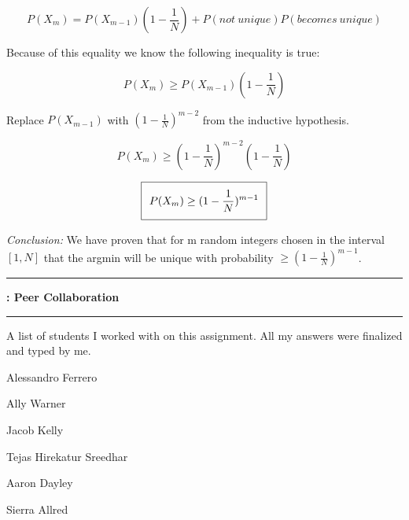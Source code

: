 \documentclass[11pt]{article}
\newcommand\question[2]{\vspace{.25in}\hrule\textbf{#1: #2}\vspace{.5em}\hrule\vspace{.10in}}
\begin{document}
$$P(X_{m}) = P(X_{m-1})(1 - \frac{1}{N}) + P(not \ unique)P(becomes \ unique)$$

Because of this equality we know the following inequality is true:

$$P(X_{m}) \geq P(X_{m-1})(1 - \frac{1}{N})$$

Replace $P(X_{m-1})$ with $(1 - \frac{1}{N})^{m-2}$ from the inductive hypothesis.

$$P(X_{m}) \geq (1 - \frac{1}{N})^{m-2}(1 - \frac{1}{N})$$

\begin{equation}
\setlength\fboxsep{0.25cm}
\setlength\fboxrule{0.4pt}
\boxed{P(X_{m}) \geq (1 - \frac{1}{N})^{m-1}}
\end{equation}

\textit{Conclusion:} We have proven that for m random integers chosen in the interval $[1, N]$ that the argmin will be unique with probability $\geq (1 - \frac{1}{N})^{m-1}$.

\question{}{Peer Collaboration}

A list of students I worked with on this assignment. All my answers were finalized and typed by me.

Alessandro Ferrero

Ally Warner

Jacob Kelly

Tejas Hirekatur Sreedhar

Aaron Dayley

Sierra Allred 
\end{document}
